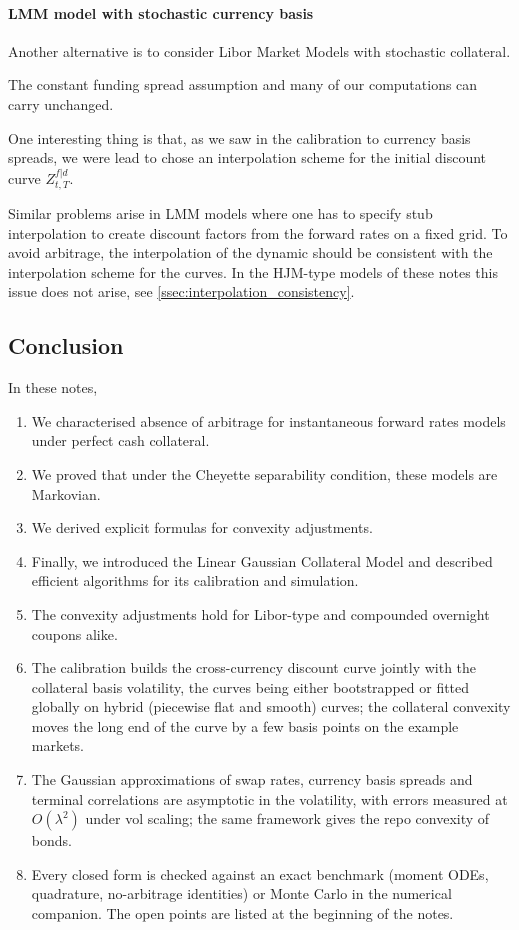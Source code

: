 \documentclass[11pt,english]{amsart}
\theoremstyle{definition}
\begin{document}
\paragraph{LMM model with stochastic currency basis}
Another alternative is to consider Libor Market Models with stochastic collateral. 

The constant funding spread assumption and many of our computations can carry unchanged. 

One interesting thing is that, as we saw in the calibration to currency basis spreads, we were lead to chose an interpolation scheme for the initial discount curve $Z^{f|d}_{t,T}$.

Similar problems arise in LMM models where one has to specify stub interpolation to create discount factors from the forward rates on a fixed grid. To avoid arbitrage, the interpolation of the dynamic should be consistent with the interpolation scheme for the curves. In the HJM-type models of these notes this issue does not arise, see \autoref{ssec:interpolation_consistency}.




\subsection{Conclusion}
In these notes, 
\begin{enumerate}
\item We characterised absence of arbitrage for instantaneous forward rates models under perfect cash collateral. 
\item We proved that under the Cheyette separability condition, these models are Markovian. 
\item We derived explicit formulas for convexity adjustments. 
\item Finally, we introduced the Linear Gaussian Collateral Model and described efficient algorithms for its calibration and simulation. 
\item The convexity adjustments hold for Libor-type and compounded overnight coupons alike.
\item The calibration builds the cross-currency discount curve jointly with the collateral basis volatility, the curves being either bootstrapped or fitted globally on hybrid (piecewise flat and smooth) curves; the collateral convexity moves the long end of the curve by a few basis points on the example markets.
\item The Gaussian approximations of swap rates, currency basis spreads and terminal correlations are asymptotic in the volatility, with errors measured at $O(\lambda^2)$ under vol scaling; the same framework gives the repo convexity of bonds.
\item Every closed form is checked against an exact benchmark (moment ODEs, quadrature, no-arbitrage identities) or Monte Carlo in the numerical companion. The open points are listed at the beginning of the notes.
\end{enumerate}
\end{document}
